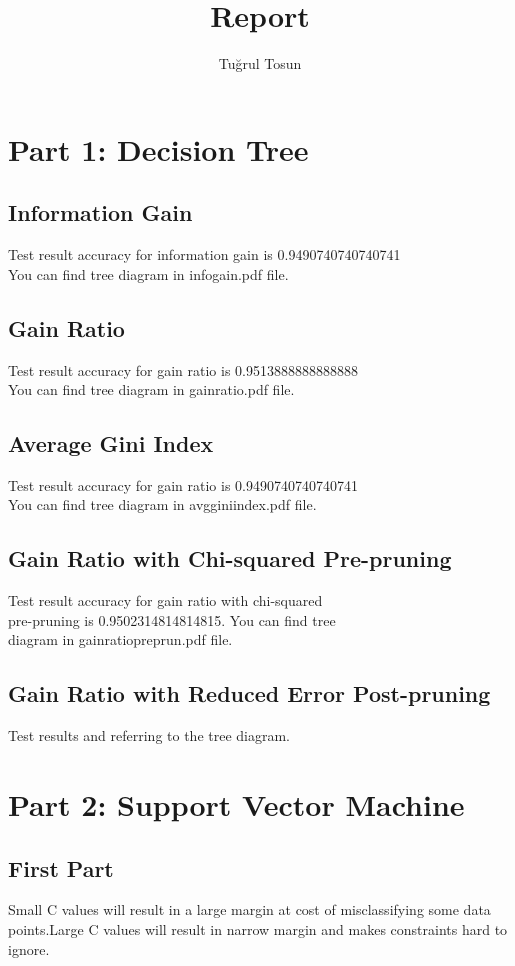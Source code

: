\documentclass{article}
\title{Report}
\author{Tuğrul Tosun}
\begin{document}
\maketitle
\section{Part 1: Decision Tree}
\subsection{Information Gain}
Test result accuracy for information gain is 0.9490740740740741\\
You can find tree diagram in infogain.pdf file.
\subsection{Gain Ratio}
Test result accuracy for gain ratio is 0.9513888888888888\\
You can find tree diagram in gainratio.pdf file.
\subsection{Average Gini Index}
Test result accuracy for gain ratio is 0.9490740740740741\\
You can find tree diagram in avgginiindex.pdf file.
\subsection{Gain Ratio with Chi-squared Pre-pruning}
Test result accuracy for gain ratio with chi-squared\\
pre-pruning is 0.9502314814814815. You can find tree \\
diagram in gainratiopreprun.pdf file.
\subsection{Gain Ratio with Reduced Error Post-pruning}
Test results and referring to the tree diagram.

\vspace{20mm}
\maketitle
\section{Part 2: Support Vector Machine}
\subsection{First Part}
Small C values will result in a large margin at cost of misclassifying some data points.Large C values will 
result in narrow margin and makes constraints hard to ignore.\\
\end{document}
